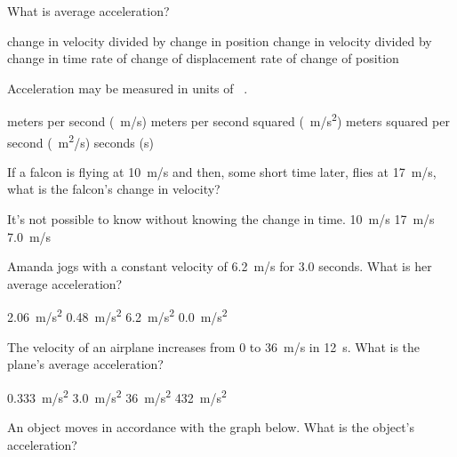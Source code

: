 \documentclass[]{exam}
\theoremstyle{definition}
\begin{document}
\begin{questions}
\question
What is average acceleration?

\begin{choices}
    \choice change in velocity divided by change in position
    \correctchoice change in velocity divided by change in time
    \choice rate of change of displacement
    \choice rate of change of position
\end{choices}

\question
Acceleration may be measured in units of \fillin\ .

\begin{choices}
    \choice meters per second (\SI{}{m/s})
    \correctchoice meters per second squared (\SI{}{m/s^2})
    \choice meters squared per second (\SI{}{m^2/s})
    \choice seconds (s)
\end{choices}

\question
If a falcon is flying at \SI{10}{m/s} and then, some short time later, flies at \SI{17}{m/s}, what is the falcon's change in velocity?

\begin{choices}
    \choice It's not possible to know without knowing the change in time.
    \choice \SI{10}{m/s}
    \choice \SI{17}{m/s}
    \correctchoice \SI{7.0}{m/s}
\end{choices}

\question
Amanda jogs with a constant velocity of \SI{6.2}{m/s} for 3.0 seconds. What is her average acceleration?

\begin{choices}
    \choice \SI{2.06}{m/s^2}
    \choice \SI{0.48}{m/s^2}
    \choice \SI{6.2}{m/s^2}
    \correctchoice \SI{0.0}{m/s^2}
\end{choices}

\question %
The velocity of an airplane increases from 0 to \SI{36}{m/s} in \SI{12}{s}. What is the plane's average acceleration?

\begin{choices}
\choice \SI{0.333}{m/s^2}
\CorrectChoice \SI{3.0}{m/s^2}
\choice \SI{36}{m/s^2}
\choice \SI{432}{m/s^2}
\end{choices}

\question
An object moves in accordance with the graph below. What is the object's acceleration?
\vspace{1em}


\end{questions}
\end{document}
